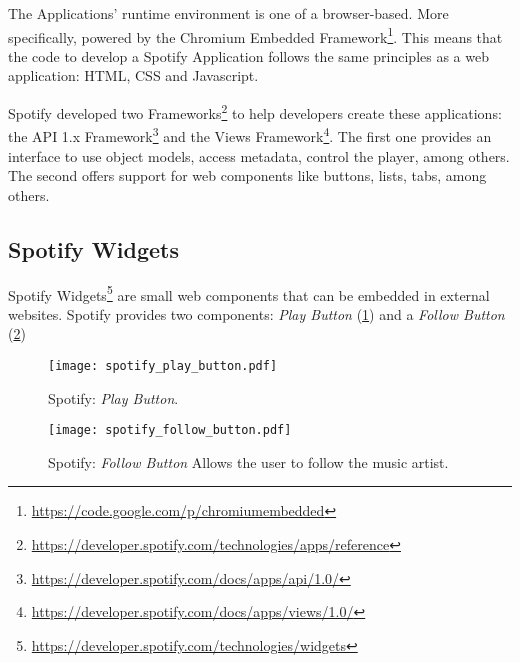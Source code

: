       The Applications' runtime environment is one of a browser-based.
      More specifically, powered by the Chromium Embedded Framework\footnote{\url{https://code.google.com/p/chromiumembedded}}.
      This means that the code to develop a Spotify Application follows the same principles as a web application: HTML, CSS and Javascript.

      Spotify developed two Frameworks\footnote{\url{https://developer.spotify.com/technologies/apps/reference}} to help developers create these applications: the API 1.x Framework\footnote{\url{https://developer.spotify.com/docs/apps/api/1.0/}} and the Views Framework\footnote{\url{https://developer.spotify.com/docs/apps/views/1.0/}}.
      The first one provides an interface to use object models, access metadata, control the player, among others.
      The second offers support for web components like buttons, lists, tabs, among others.



    \subsection{Spotify Widgets} %
    \label{sub:spotify_widgets}

      Spotify Widgets\footnote{\url{https://developer.spotify.com/technologies/widgets}} are small web components that can be embedded in external websites.
      Spotify provides two components: \emph{Play Button} (\ref{fig:spotify_play_button}) and a \emph{Follow Button} (\ref{fig:spotify_follow_button})

      \begin{figure}[H]
        \begin{center}
          \texttt{[image: spotify\_play\_button.pdf]}
        \end{center}
        \caption{Spotify: \emph{Play Button}.}
        \label{fig:spotify_play_button}
      \end{figure}

      \begin{figure}[H]
        \begin{center}
          \texttt{[image: spotify\_follow\_button.pdf]}
        \end{center}
        \caption{Spotify: \emph{Follow Button} Allows the user to follow the music artist.}
        \label{fig:spotify_follow_button}
      \end{figure}

